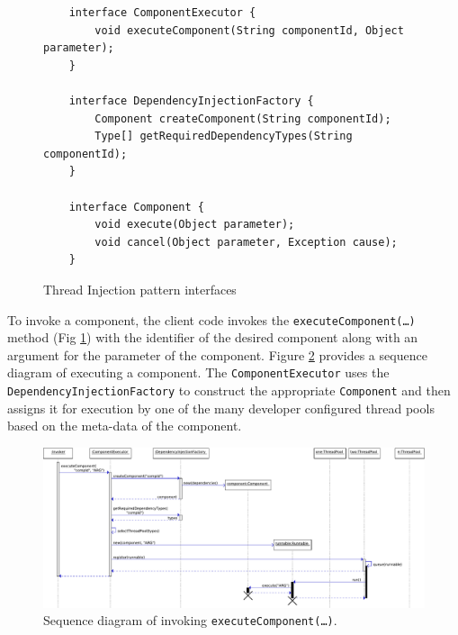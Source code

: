 \documentclass[prodmode]{style/acmlarge}
\begin{document}
\begin{figure}[tp]
\centering
\begin{verbatim}
    interface ComponentExecutor {
        void executeComponent(String componentId, Object parameter);
    }

    interface DependencyInjectionFactory {
        Component createComponent(String componentId);
        Type[] getRequiredDependencyTypes(String componentId);
    }

    interface Component {
        void execute(Object parameter); 
        void cancel(Object parameter, Exception cause);
    }
\end{verbatim}
\caption{Thread Injection pattern interfaces\footnotemark}
\label{fig:ThreadInjectionInterfaces}
\end{figure}

To invoke a component, the client code invokes the
\texttt{executeComponent(\ldots)} method (Fig
\ref{fig:ThreadInjectionInterfaces}) with the identifier of the desired
component along with an argument for the parameter of the component.
Figure \ref{fig:ExecuteComponentSequenceDiagram} provides a sequence diagram of
executing a component.  The \texttt{ComponentExecutor} uses the
\texttt{DependencyInjectionFactory} to construct the appropriate
\texttt{Component} and then assigns it for execution by one of the many
developer configured thread pools based on the meta-data of the component.

\begin{figure}[!t]
\centering
\includegraphics[width=6in]{ExecuteComponentSequenceDiagram}
\caption{Sequence diagram of invoking \texttt{executeComponent(\ldots)}.}
\label{fig:ExecuteComponentSequenceDiagram}
\end{figure}
\end{document}
